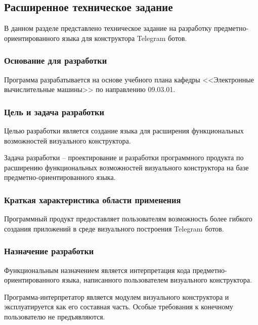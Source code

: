 \subsection{Расширенное техническое задание}

В данном разделе представлено техническое задание на разработку предметно-ориентированного языка для конструктора Telegram ботов.

\subsubsection{Основание для разработки}

Программа разрабатывается на основе учебного плана кафедры
<<Электронные вычислительные машины>> по направлению 09.03.01.



\subsubsection{Цель и задача разработки}

Целью разработки является создание языка для расширения
функциональных возможностей визуального конструктора.

Задача разработки -- проектирование и разработки программного продукта по расширению функциональных возможностей визуального конструктора
на базе предметно-ориентированного языка. 



\subsubsection{Краткая характеристика области применения}

Программный продукт предоставляет пользователям возможность более гибкого создания приложений в среде визуального построения Telegram ботов.



\subsubsection{Назначение разработки}

Функциональным назначением является интерпретация кода предметно-ориентированного языка, написанного пользователем визуального конструктора.

Программа-интерпретатор является модулем визуального конструктора и эксплуатируется как его составная часть.
Особые требования к конечному пользователю не предъявляются.




